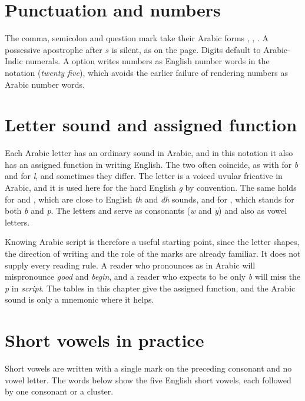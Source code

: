 \begin{table}[ht]\centering\small

\caption{Fixed spellings of frequent words.}\label{tab:common}
\end{table}

\section{Punctuation and numbers}
The comma, semicolon and question mark take their Arabic forms , , . A possessive apostrophe after $s$ is silent, as on the page. Digits default to Arabic-Indic numerals. A  option writes numbers as English number words in the notation (\emph{twenty five}), which avoids the earlier failure of rendering numbers as Arabic number words.

\section{Letter sound and assigned function}
Each Arabic letter has an ordinary sound in Arabic, and in this notation it also has an assigned function in writing English. The two often coincide, as with  for \emph{b} and  for \emph{l}, and sometimes they differ. The letter  is a voiced uvular fricative in Arabic, and it is used here for the hard English \emph{g} by convention. The same holds for  and , which are close to English \emph{th} and \emph{dh} sounds, and for , which stands for both \emph{b} and \emph{p}. The letters  and  serve as consonants (\emph{w} and \emph{y}) and also as vowel letters.

Knowing Arabic script is therefore a useful starting point, since the letter shapes, the direction of writing and the role of the marks are already familiar. It does not supply every reading rule. A reader who pronounces  as in Arabic will mispronounce \emph{good} and \emph{begin}, and a reader who expects  to be only \emph{b} will miss the \emph{p} in \emph{script}. The tables in this chapter give the assigned function, and the Arabic sound is only a mnemonic where it helps.

\section{Short vowels in practice}
Short vowels are written with a single mark on the preceding consonant and no vowel letter. The words below show the five English short vowels, each followed by one consonant or a cluster.

